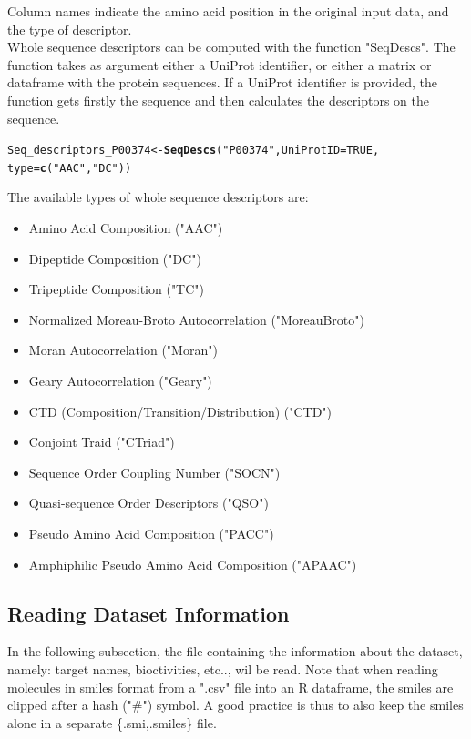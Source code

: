 \documentclass[twoside,a4wide,12pt]{article}\usepackage[]{graphicx}\usepackage[]{color}
\makeatletter
\newcommand{\hlnum}[1]{\textcolor[rgb]{0.686,0.059,0.569}{#1}}%
\newcommand{\hlstr}[1]{\textcolor[rgb]{0.192,0.494,0.8}{#1}}%
\newcommand{\hlstd}[1]{\textcolor[rgb]{0.345,0.345,0.345}{#1}}%
\newcommand{\hlkwb}[1]{\textcolor[rgb]{0.69,0.353,0.396}{#1}}%
\newcommand{\hlkwc}[1]{\textcolor[rgb]{0.333,0.667,0.333}{#1}}%
\newcommand{\hlkwd}[1]{\textcolor[rgb]{0.737,0.353,0.396}{\textbf{#1}}}%
\newenvironment{kframe}{%
 \def\at@end@of@kframe{}%
 \ifinner\ifhmode%
  \def\at@end@of@kframe{\end{minipage}}%
  \begin{minipage}{\columnwidth}%
 \fi\fi%
 \def\FrameCommand##1{\hskip\@totalleftmargin \hskip-\fboxsep
 \colorbox{shadecolor}{##1}\hskip-\fboxsep
     \hskip-\linewidth \hskip-\@totalleftmargin \hskip\columnwidth}%
 \MakeFramed {\advance\hsize-\width
   \@totalleftmargin\z@ \linewidth\hsize
   \@setminipage}}%
 {\par\unskip\endMakeFramed%
 \at@end@of@kframe}
\newenvironment{knitrout}{}{} %
\makeatother
\begin{document}
Column names indicate the amino acid position in the original input data, and the type of descriptor.
\\
Whole sequence descriptors can be computed with the function "SeqDescs". 
The function takes as argument either a UniProt identifier, or either a matrix or dataframe with the protein sequences.
If a UniProt identifier is provided, the function gets firstly the sequence and then calculates the descriptors on the sequence.

\begin{knitrout}
\color{fgcolor}\begin{kframe}
\begin{alltt}
\hlstd{Seq_descriptors_P00374} \hlkwb{<-} \hlkwd{SeqDescs}\hlstd{(}\hlstr{"P00374"}\hlstd{,} \hlkwc{UniProtID} \hlstd{=} \hlnum{TRUE}\hlstd{,}
    \hlkwc{type} \hlstd{=} \hlkwd{c}\hlstd{(}\hlstr{"AAC"}\hlstd{,} \hlstr{"DC"}\hlstd{))}
\end{alltt}
\end{kframe}
\end{knitrout}

The available types of whole sequence descriptors are:\cite{protr}
\begin{itemize}
\item Amino Acid Composition ("AAC")
\item Dipeptide Composition ("DC")
\item Tripeptide Composition ("TC")
\item Normalized Moreau-Broto Autocorrelation ("MoreauBroto")
\item Moran Autocorrelation ("Moran")
\item Geary Autocorrelation ("Geary")
\item  CTD (Composition/Transition/Distribution) ("CTD")
\item Conjoint Traid ("CTriad")
\item Sequence Order Coupling Number ("SOCN")
\item Quasi-sequence Order Descriptors ("QSO")
\item Pseudo Amino Acid Composition ("PACC")
\item Amphiphilic Pseudo Amino Acid Composition ("APAAC")
\end{itemize}

\subsection{Reading Dataset Information}
In the following subsection, 
the file containing the information about the dataset, namely: target names, bioctivities, etc.., wil be read.
Note that when reading molecules in smiles format from a ".csv" file into an R dataframe, the smiles are clipped after a hash ("\#") symbol.
A good practice is thus to also keep the smiles alone in a separate \{.smi,.smiles\} file.
\end{document}
